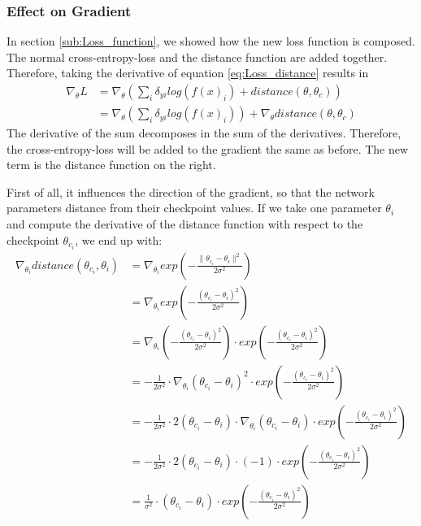 \subsubsection{Effect on Gradient}\label{sub:Effect_on_Gradient} In section
\ref{sub:Loss_function}, we showed how the new loss function is composed. The
normal cross-entropy-loss and the distance function are added together.
Therefore, taking the derivative of equation \ref{eq:Loss_distance} results in 
\begin{align}
    \nabla_\theta L 
    &= \nabla_\theta (\sum_{i} \delta_{yi} log(f(x)_i) + distance(\theta, \theta_c))\\
    &= \nabla_\theta (\sum_{i} \delta_{yi} log(f(x)_i)) + \nabla_\theta distance(\theta, \theta_c)
\end{align}
The derivative of the sum decomposes in the sum of the derivatives. Therefore,
the cross-entropy-loss will be added to the gradient the same as before. The new
term is the distance function on the right.

First of all, it influences the direction of the gradient, so that the network
parameters distance from their checkpoint values. If we take one parameter
$\theta_i$ and compute the derivative of the distance function with respect to the
checkpoint $\theta_{c_i}$, we end up with:
\begin{align}
    \nabla_{\theta_i} distance(\theta_{c_i}, \theta_i)
    &= \nabla_{\theta_i} exp(-\frac{\rVert \theta_{c_i} - \theta_i \lVert^2}{2\sigma^2}) \\
    &= \nabla_{\theta_i} exp(-\frac{(\theta_{c_i} - \theta_i)^2}{2\sigma^2}) \\
    &= \nabla_{\theta_i} (-\frac{(\theta_{c_i} - \theta_i)^2}{2\sigma^2}) \cdot exp(-\frac{(\theta_{c_i} - \theta_i)^2}{2\sigma^2}) \\
    &= -\frac{1}{2\sigma^2} \cdot \nabla_{\theta_i} (\theta_{c_i} - \theta_i)^2 \cdot exp(-\frac{(\theta_{c_i} - \theta_i)^2}{2\sigma^2}) \\
    &= -\frac{1}{2\sigma^2} \cdot 2 (\theta_{c_i} - \theta_i) \cdot \nabla_{\theta_i}(\theta_{c_i} - \theta_i) \cdot exp(-\frac{(\theta_{c_i} - \theta_i)^2}{2\sigma^2}) \\
    &= -\frac{1}{2\sigma^2} \cdot 2 (\theta_{c_i} - \theta_i) \cdot (-1) \cdot exp(-\frac{(\theta_{c_i} - \theta_i)^2}{2\sigma^2}) \\
    &= \frac{1}{\sigma^2} \cdot (\theta_{c_i} - \theta_i) \cdot exp(-\frac{(\theta_{c_i} - \theta_i)^2}{2\sigma^2}) \\
\end{align}

